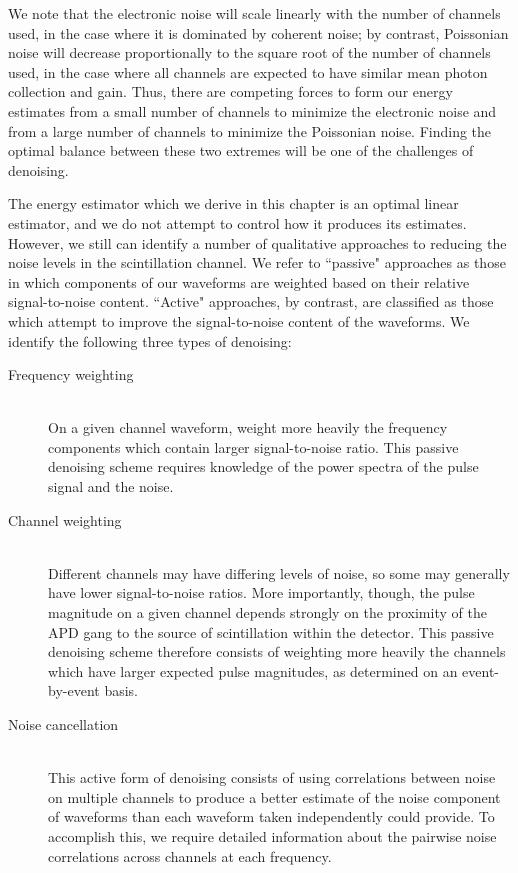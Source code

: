 We note that the electronic noise will scale linearly with the number of channels used, in the case where it is dominated by coherent noise; by contrast, Poissonian noise will decrease proportionally to the square root of the number of channels used, in the case where all channels are expected to have similar mean photon collection and gain.  Thus, there are competing forces to form our energy estimates from a small number of channels to minimize the electronic noise and from a large number of channels to minimize the Poissonian noise.  Finding the optimal balance between these two extremes will be one of the challenges of denoising.

The energy estimator which we derive in this chapter is an optimal linear estimator, and we do not attempt to control how it produces its estimates.  However, we still can identify a number of qualitative approaches to reducing the noise levels in the scintillation channel.  We refer to ``passive" approaches as those in which components of our waveforms are weighted based on their relative signal-to-noise content.  ``Active" approaches, by contrast, are classified as those which attempt to improve the signal-to-noise content of the waveforms.  We identify the following three types of denoising:
\begin{description}
\item[Frequency weighting] \hfill \\
On a given channel waveform, weight more heavily the frequency components which contain larger signal-to-noise ratio.  This passive denoising scheme requires knowledge of the power spectra of the pulse signal and the noise.

\item[Channel weighting] \hfill \\
Different channels may have differing levels of noise, so some may generally have lower signal-to-noise ratios.  More importantly, though, the pulse magnitude on a given channel depends strongly on the proximity of the APD gang to the source of scintillation within the detector.  This passive denoising scheme therefore consists of weighting more heavily the channels which have larger expected pulse magnitudes, as determined on an event-by-event basis.

\item[Noise cancellation] \hfill \\
This active form of denoising consists of using correlations between noise on multiple channels to produce a better estimate of the noise component of waveforms than each waveform taken independently could provide.  To accomplish this, we require detailed information about the pairwise noise correlations across channels at each frequency.
\end{description}

